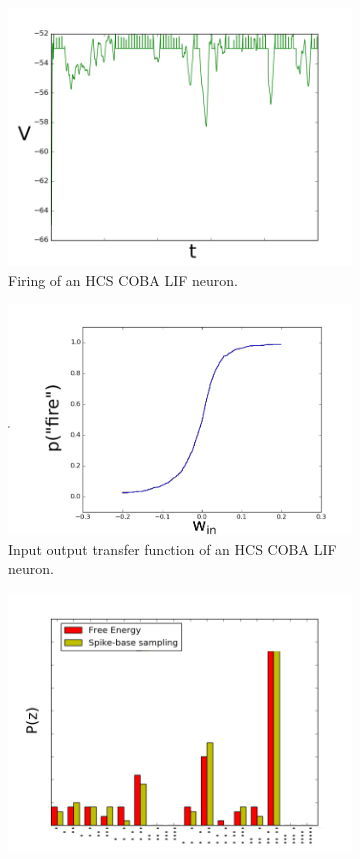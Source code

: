 \begin{figure}
	\centering
	\begin{subfigure}[t]{.5\textwidth}
  		\centering
  		\includegraphics[width=.8\linewidth]{imgs/coba_lif_act.png}
  		\caption{Firing of an HCS COBA LIF neuron.}
  		\label{fig:cobahcs1}
	\end{subfigure}%
	\begin{subfigure}[t]{.5\textwidth}
  		\centering
  		\includegraphics[width=.8\linewidth]{imgs/coba_lif_sigmoid.png}
  		\caption{Input output transfer function of an HCS COBA LIF neuron.}
  		\label{fig:cobahcs2}
	\end{subfigure}
	\begin{subfigure}[t]{.5\textwidth}
  		\centering
  		\includegraphics[width=.8\linewidth]{imgs/coba_lif_bm2.png}

\end{subfigure}
\end{figure}
